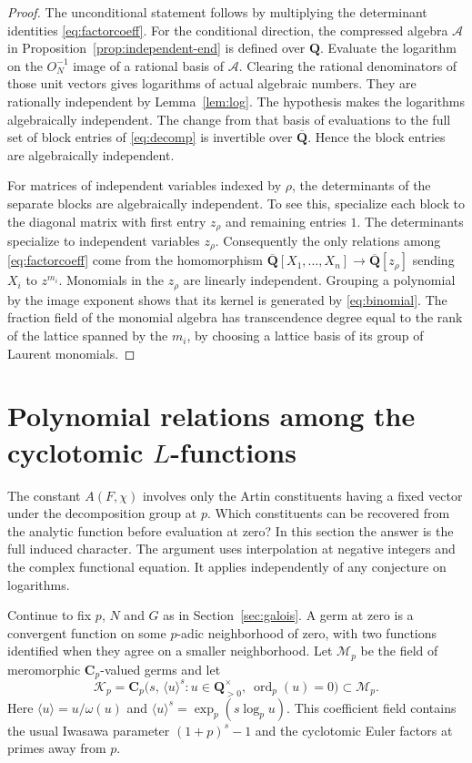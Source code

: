 \documentclass[11pt]{amsart}
\numberwithin{equation}{section}
\theoremstyle{definition}
\theoremstyle{remark}
\newcommand{\Q}{\mathbf Q}
\newcommand{\Qbar}{\overline{\mathbf Q}}
\newcommand{\Cp}{\mathbf C_p}
\newcommand{\ord}{\operatorname{ord}}
\begin{document}
\begin{proof}
The unconditional statement follows by multiplying the
determinant identities \eqref{eq:factorcoeff}. For the
conditional direction, the compressed algebra $\mathcal A$
in Proposition~\ref{prop:independent-end} is defined over
$\Q$. Evaluate the logarithm on the $O_N^{-1}$ image of
a rational basis of $\mathcal A$. Clearing the rational
denominators of those unit vectors gives logarithms of
actual algebraic numbers. They are rationally independent
by Lemma~\ref{lem:log}. The hypothesis makes the
logarithms algebraically independent. The change from that
basis of evaluations to the full set of block entries of
\eqref{eq:decomp} is invertible over $\Qbar$. Hence the
block entries are algebraically independent.

For matrices of independent variables indexed by $\rho$,
the determinants of the separate blocks are algebraically
independent. To see this, specialize each block to the
diagonal matrix with first entry $z_\rho$ and remaining
entries $1$. The determinants specialize to independent
variables $z_\rho$. Consequently the only relations among
\eqref{eq:factorcoeff} come from the homomorphism
$\Qbar[X_1,\ldots,X_n]\to\Qbar[z_\rho]$ sending
$X_i$ to $z^{m_i}$. Monomials in the $z_\rho$ are linearly
independent. Grouping a polynomial by the image exponent
shows that its kernel is generated by \eqref{eq:binomial}.
The fraction field of the monomial algebra has
transcendence degree equal to the rank of the lattice
spanned by the $m_i$, by choosing a lattice basis of its
group of Laurent monomials.
\end{proof}

\section{Polynomial relations among the cyclotomic \texorpdfstring{$L$}{L}-functions}
\label{sec:germs}

The constant $A(F,\chi)$ involves only the Artin constituents having
a fixed vector under the decomposition group at $p$. Which
constituents can be recovered from the analytic function before
evaluation at zero? In this section the answer is the full induced
character. The argument uses interpolation at negative integers and
the complex functional equation. It applies independently of any
conjecture on logarithms.

Continue to fix $p$, $N$ and $G$ as in Section~\ref{sec:galois}.
A germ at zero is a convergent function on some $p$-adic neighborhood
of zero, with two functions identified when they agree on a smaller
neighborhood. Let $\mathcal M_p$ be the field of meromorphic
$\Cp$-valued germs and let
\[
 \mathcal K_p=\Cp\bigl(s,\,\langle u\rangle^s:
       u\in\Q_{>0}^{\times},\ \ord_p(u)=0\bigr)\subset\mathcal M_p .
\]
Here $\langle u\rangle=u/\omega(u)$ and
$\langle u\rangle^s=\exp_p(s\log_p u)$. This coefficient field
contains the usual Iwasawa parameter $(1+p)^s-1$ and the
cyclotomic Euler factors at primes away from $p$.
\end{document}
